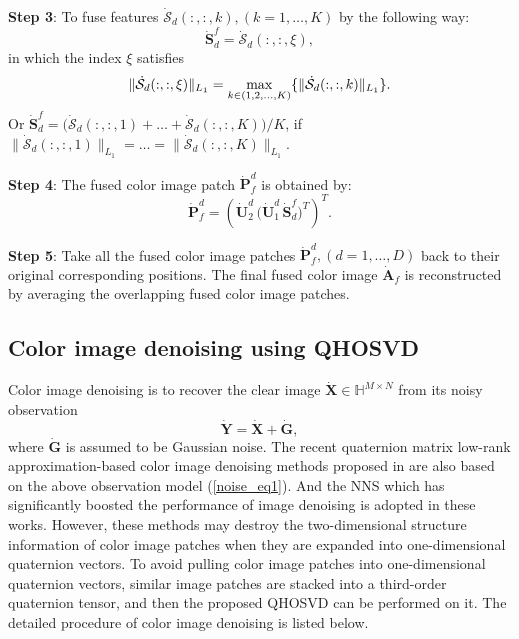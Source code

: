 \documentclass[journal]{IEEEtran}
\begin{document}
\textbf{Step 3}: To fuse features $\dot{\mathcal{S}}_{d}(:,:,k), (k=1, \ldots, K)$ by the following way:
\begin{equation}\label{fuse_features}
\dot{\mathbf{S}}_{d}^{f}=\dot{\mathcal{S}}_{d}(:,:,\xi),
\end{equation}
in which the index $\xi$ satisfies
\begin{equation*}
\|\dot{\mathcal{S}}_{d}(:,:,\xi)\|_{L_{1}}=\mathop{{\rm{max}}}\limits_{k\in(1,2,\ldots,K)}\{\|\dot{\mathcal{S}}_{d}(:,:,k)\|_{L_{1}}\}.
\end{equation*} 
Or $\dot{\mathbf{S}}_{d}^{f}=\big(\dot{\mathcal{S}}_{d}(:,:,1)+\ldots+\dot{\mathcal{S}}_{d}(:,:,K)\big)/K$, if $\|\dot{\mathcal{S}}_{d}(:,:,1)\|_{L_{1}}=\ldots=\|\dot{\mathcal{S}}_{d}(:,:,K)\|_{L_{1}}$.

\textbf{Step 4}:
The fused color image patch $\dot{\mathbf{P}}_{f}^{d}$ is obtained by:
\begin{equation}\label{fuse_images}
\dot{\mathbf{P}}_{f}^{d}=\left(\dot{\mathbf{U}}_{2}^{d}\,\big(\dot{\mathbf{U}}_{1}^{d}\,\dot{\mathbf{S}}_{d}^{f}\big)^{T}\right)^{T}.
\end{equation}

\textbf{Step 5}: Take all the fused color image patches $\dot{\mathbf{P}}_{f}^{d}, (d=1, \ldots, D)$ back to their original corresponding
positions. The final fused color image $\dot{\mathbf{A}}_{f}$ is reconstructed by averaging the overlapping fused color image patches. 

\subsection{Color image denoising using QHOSVD}
Color image denoising is to recover the clear image $\dot{\mathbf{X}}\in\mathbb{H}^{M\times N}$ from its noisy observation
\begin{equation}
\label{noise_eq1}
\dot{\mathbf{Y}}=\dot{\mathbf{X}}+\dot{\mathbf{G}},
\end{equation}
where $\dot{\mathbf{G}}$ is assumed to be Gaussian noise. The recent quaternion matrix low-rank approximation-based color image denoising methods proposed in \cite{DBLP:journals/tip/ChenXZ20,DBLP:journals/ijon/YuZY19} are also based on the above observation model (\ref{noise_eq1}).
And the NNS which has significantly boosted the performance of image denoising is adopted in these works. However, these methods may destroy the two-dimensional structure information of color image patches when they are expanded into one-dimensional quaternion vectors. To avoid pulling color image patches into one-dimensional quaternion vectors, similar image patches are stacked into a third-order quaternion tensor, and then the proposed QHOSVD can be performed on it. The detailed procedure of color image denoising is listed below.
\end{document}
